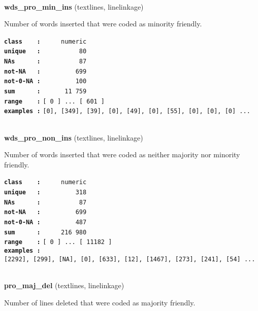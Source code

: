 \documentclass[]{article}
\begin{document}
~

\textbf{wds\_pro\_min\_ins} (textlines, linelinkage)

Number of words inserted that were coded as minority friendly.

\textbf{\texttt{class\ \ \ \ :}} \texttt{~~~~~numeric}\\
\textbf{\texttt{unique\ \ \ :}} \texttt{~~~~~~~~~~80}\\
\textbf{\texttt{NAs\ \ \ \ \ \ :}} \texttt{~~~~~~~~~~87}\\
\textbf{\texttt{not-NA\ \ \ :}} \texttt{~~~~~~~~~699}\\
\textbf{\texttt{not-0-NA\ :}} \texttt{~~~~~~~~~100}\\
\textbf{\texttt{sum\ \ \ \ \ \ :}} \texttt{~~~~~~11~759}\\
\textbf{\texttt{range\ \ \ \ :}}
\texttt{{[}\ 0\ {]}\ ...\ {[}\ 601\ {]}}\\
\textbf{\texttt{examples\ :}}
\texttt{{[}0{]},\ {[}349{]},\ {[}39{]},\ {[}0{]},\ {[}49{]},\ {[}0{]},\ {[}55{]},\ {[}0{]},\ {[}0{]},\ {[}0{]}\ ...}\\

~

\textbf{wds\_pro\_non\_ins} (textlines, linelinkage)

Number of words inserted that were coded as neither majority nor
minority friendly.

\textbf{\texttt{class\ \ \ \ :}} \texttt{~~~~~numeric}\\
\textbf{\texttt{unique\ \ \ :}} \texttt{~~~~~~~~~318}\\
\textbf{\texttt{NAs\ \ \ \ \ \ :}} \texttt{~~~~~~~~~~87}\\
\textbf{\texttt{not-NA\ \ \ :}} \texttt{~~~~~~~~~699}\\
\textbf{\texttt{not-0-NA\ :}} \texttt{~~~~~~~~~487}\\
\textbf{\texttt{sum\ \ \ \ \ \ :}} \texttt{~~~~~216~980}\\
\textbf{\texttt{range\ \ \ \ :}}
\texttt{{[}\ 0\ {]}\ ...\ {[}\ 11182\ {]}}\\
\textbf{\texttt{examples\ :}}
\texttt{{[}2292{]},\ {[}299{]},\ {[}NA{]},\ {[}0{]},\ {[}633{]},\ {[}12{]},\ {[}1467{]},\ {[}273{]},\ {[}241{]},\ {[}54{]}\ ...}\\

~

\textbf{pro\_maj\_del} (textlines, linelinkage)

Number of lines deleted that were coded as majority friendly.
\end{document}
